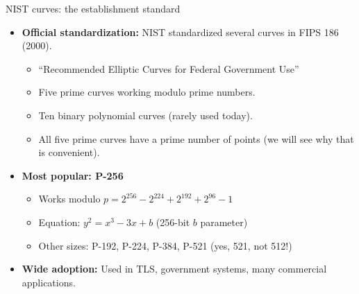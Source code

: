 \ifdefined\PRESENTATION\else\PassOptionsToClass{handout}{beamer}\fi\documentclass[aspectratio=169, lualatex]{beamer}
\begin{document}
\begin{frame}{NIST curves: the establishment standard}
	\begin{itemize}
		\item \textbf{Official standardization:} NIST standardized several curves in FIPS 186 (2000).
		      \begin{itemize}
			      \item ``Recommended Elliptic Curves for Federal Government Use''
			      \item Five prime curves working modulo prime numbers.
			      \item Ten binary polynomial curves (rarely used today).
			      \item All five prime curves have a prime number of points (we will see why that is convenient).
		      \end{itemize}
		\item \textbf{Most popular: P-256}
		      \begin{itemize}
			      \item Works modulo $p = 2^{256} - 2^{224} + 2^{192} + 2^{96} - 1$
			      \item Equation: $y^2 = x^3 - 3x + b$ (256-bit $b$ parameter)
			      \item Other sizes: P-192, P-224, P-384, P-521 (yes, 521, not 512!)
		      \end{itemize}
		\item \textbf{Wide adoption:} Used in TLS, government systems, many commercial applications.
	\end{itemize}
\end{frame}
\end{document}
